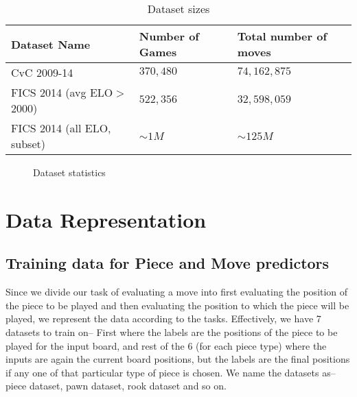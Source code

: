 \begin{table}[H]
\centering
\begin{tabular}{@{}lll@{}}
\toprule
Dataset Name & Number of Games 	& Total number of moves  \\
\midrule
CvC 2009-14  & $370,480$	& $74,162,875$             \\ 
FICS 2014 (avg ELO$>$2000)    & $522,356$    	& $32,598,059$      \\
FICS 2014 (all ELO, subset) & $\sim 1M$ & $\sim 125M$\\
\bottomrule
\end{tabular}
\caption{Dataset sizes}
\end{table}

\begin{figure}
  \hspace{0.5in}
  \scalebox{.7}{}
  \caption{Dataset statistics}
  \label{figure:datasets}
\end{figure}

\section{Data Representation}
\subsection{Training data for Piece and Move predictors}
Since we divide our task of evaluating a move into first evaluating the position 
of the piece to be played and then evaluating the position to which the piece 
will be played, we represent the data according to the tasks. Effectively, we 
have 7 datasets to train on-- First where the labels are the positions of the 
piece to be played for the input board, and rest of the 6 (for each piece type) 
where the inputs are again the current board positions, but the labels are the 
final positions if any one of that particular type of piece is chosen. We name 
the datasets as-- piece dataset, pawn dataset, rook dataset and so on. 

